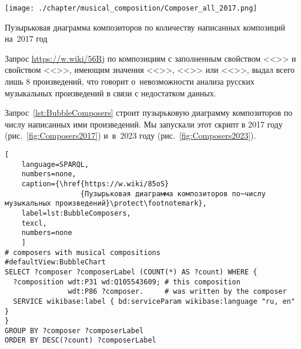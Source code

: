 
\begin{marginfigure}[1\baselineskip]
  \texttt{[image: ./chapter/musical\_composition/Composer\_all\_2017.png]}
  \vspace{-7pt}
  \caption[Пузырьковая диаграмма композиторов по количеству написанных композиций на~2017 год]{Пузырьковая диаграмма композиторов по количеству написанных композиций на~2017 год}%
  \label{fig:Composers2017}%
\end{marginfigure}

Запрос \href{https://w.wiki/56Rj}{https://w.wiki/56Rj} по композициям с заполненным свойством <<>> и свойством <<>>, имеющим значения <<>>, <<>> или <<>>, выдал всего лишь \num{8} произведений, что говорит о~невозможности анализа русских музыкальных произведений в связи с недостатком данных.


Запрос~\ref{lst:BubbleComposers} строит пузырьковую диаграмму композиторов по числу написанных ими произведений.
Мы запускали этот скрипт в 2017 году (рис.~\ref{fig:Composers2017}) 
и~в~2023 году (рис.~\ref{fig:Composers2023}).

\begin{lstlisting}[ 
    language=SPARQL, 
    numbers=none,
    caption={\href{https://w.wiki/85oS}
                  {Пузырьковая диаграмма композиторов по~числу музыкальных произведений}\protect\footnotemark},
    label=lst:BubbleComposers,
    texcl,
    numbers=none
    ]
# composers with musical compositions
#defaultView:BubbleChart
SELECT ?composer ?composerLabel (COUNT(*) AS ?count) WHERE {
  ?composition wdt:P31 wd:Q105543609; # this composition
               wdt:P86 ?composer.     # was written by the composer
  SERVICE wikibase:label { bd:serviceParam wikibase:language "ru, en" }
}
GROUP BY ?composer ?composerLabel
ORDER BY DESC(?count) ?composerLabel
\end{lstlisting}%



